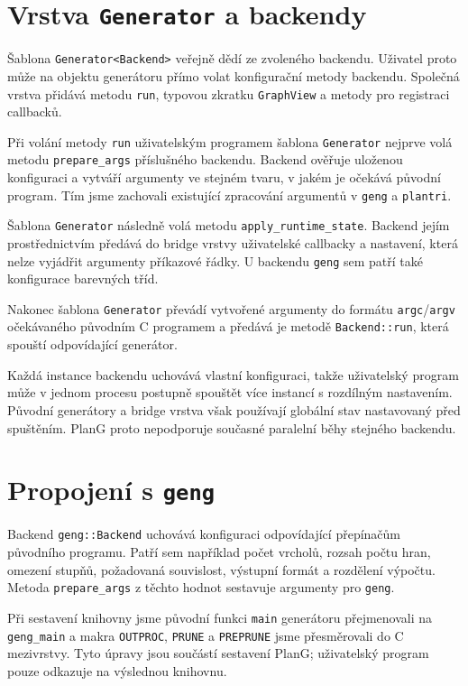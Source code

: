\section{Vrstva \texttt{Generator} a backendy}
\label{sec:implementation-generator-backends}

Šablona \texttt{Generator\textless Backend\textgreater} veřejně dědí ze
zvoleného backendu. Uživatel proto může na objektu generátoru přímo volat
konfigurační metody backendu. Společná vrstva přidává metodu \texttt{run},
typovou zkratku \texttt{GraphView} a metody pro registraci callbacků.

Při volání metody \texttt{run} uživatelským programem šablona
\texttt{Generator} nejprve volá metodu \texttt{prepare\_args} příslušného
backendu. Backend ověřuje uloženou konfiguraci a vytváří argumenty ve stejném
tvaru, v jakém je očekává původní program. Tím jsme zachovali existující
zpracování argumentů v \texttt{geng} a \texttt{plantri}.

Šablona \texttt{Generator} následně volá metodu
\texttt{apply\_runtime\_state}. Backend jejím prostřednictvím předává do bridge
vrstvy uživatelské callbacky a nastavení, která nelze vyjádřit argumenty
příkazové řádky. U backendu \texttt{geng} sem patří také konfigurace barevných
tříd.

Nakonec šablona \texttt{Generator} převádí vytvořené argumenty do formátu
\texttt{argc}/\texttt{argv} očekávaného původním C programem a předává je
metodě \texttt{Backend::run}, která spouští odpovídající generátor.

Každá instance backendu uchovává vlastní konfiguraci, takže uživatelský program
může v jednom procesu postupně spouštět více instancí s rozdílným nastavením.
Původní generátory a bridge vrstva však používají globální stav nastavovaný
před spuštěním. PlanG proto nepodporuje současné paralelní běhy stejného
backendu.


\section{Propojení s \texttt{geng}}
\label{sec:implementation-geng}

Backend \texttt{geng::Backend} uchovává konfiguraci odpovídající přepínačům
původního programu. Patří sem například počet vrcholů, rozsah počtu hran,
omezení stupňů, požadovaná souvislost, výstupní formát a rozdělení výpočtu.
Metoda \texttt{prepare\_args} z těchto hodnot sestavuje argumenty pro
\texttt{geng}.

Při sestavení knihovny jsme původní funkci \texttt{main} generátoru přejmenovali
na \texttt{geng\_main} a makra \texttt{OUTPROC}, \texttt{PRUNE} a
\texttt{PREPRUNE} jsme přesměrovali do C mezivrstvy. Tyto úpravy jsou součástí
sestavení PlanG; uživatelský program pouze odkazuje na výslednou knihovnu.


